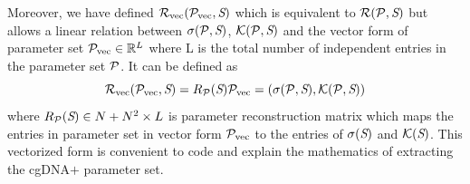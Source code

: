 Moreover, we have defined ${\mathcal R}_{\text{vec}}({\mathcal P}_\text{vec},{\textit{S}})$ which is equivalent to ${\mathcal R}({\mathcal P},{\textit{S}})$ but allows a linear relation between $\sigma({\mathcal P},{\textit{S}})$, ${\mathcal K}({\mathcal P},{\textit{S}})$ and the vector form of parameter set ${\mathcal P}_\text{vec} \in {\mathbb R}^{L}$ where L is the total number of independent entries in the parameter set ${\mathcal P}$. 
It can be defined as
\begin{equation}
{\mathcal R}_{\text{vec}}({\mathcal P}_\text{vec},{\textit{S}}) = R_{{\mathcal P}}({\textit{S}}){\mathcal P}_\text{vec}= (\sigma({\mathcal P},{\textit{S}}),{\mathcal K}({\mathcal P},{\textit{S}}) )
\label{reconsmap2}    
\end{equation}
where $R_{{\mathcal P}}({\textit{S}}) \in N+N^2 \times L$ is parameter reconstruction matrix which maps the entries in parameter set in vector form ${\mathcal P}_\text{vec}$ to the entries of $\sigma({\textit{S}})$ and ${\mathcal K}({\textit{S}})$.
This vectorized form is convenient to code and explain the mathematics of extracting the cgDNA$+$ parameter set.\clearpage
